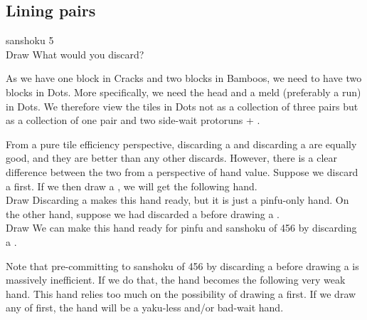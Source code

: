 \newpage
\subsection{Lining pairs}\label{sec:san5}
\begin{itembox}[r]{{\jap sanshoku} 5}
\bp
{}~\\
\hspace{290pt}\footnotesize{Draw}
\ep
\vspace{-17pt}What would you discard? \vspace{-5pt}
\end{itembox}
\noindent
As we have one block in Cracks and two blocks in Bamboos, we need to have two blocks in Dots. More specifically, we need the head and a meld (preferably a run) in Dots. 
We therefore view the tiles in Dots not as a collection of three pairs but as a collection of one pair {\large{}} and two side-wait protoruns {\large{}} + {\large{}}. 

\bigskip
From a pure tile efficiency perspective, discarding a {\large{}} and discarding a {\large{}} are equally good, and they are better than any other discards. However, there is a clear difference between the two from a perspective of hand value. 
Suppose we discard a {\large{}} first. If we then draw a {\large{}}, we will get the following hand.
\bp
{}~\\
\hspace{290pt}\footnotesize{Draw}
\ep
Discarding a {\large{}} makes this hand ready, but it is just a {\jap pinfu}-only hand. On the other hand, suppose we had discarded a {\large{}} before drawing a {\large{}}. 
\bp
{}~\\
\hspace{290pt}\footnotesize{Draw}
\ep
We can make this hand ready for {\jap pinfu} and {\jap sanshoku} of 456 by discarding a {\large{}}. 

\bigskip
Note that pre-committing to {\jap sanshoku} of 456 by discarding a {\large{}} before drawing a {\large{}} is massively inefficient. If we do that, the hand becomes the following very weak hand. 
\bp
{}
\ep
This hand relies too much on the possibility of drawing a {\large{}} first. If we draw any of {\large{}} first, the hand will be a {\jap yaku}-less and/or bad-wait hand.

